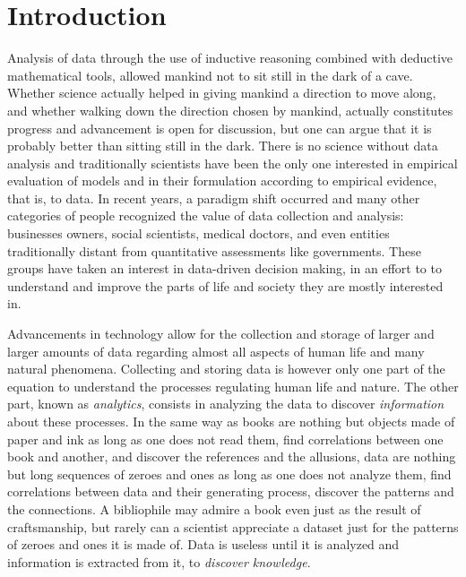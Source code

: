 \chapter{Introduction}\label{ch:intro}
Analysis of data through the use of inductive reasoning combined with
deductive mathematical tools, allowed mankind not to sit still in the dark of a
cave. Whether science actually helped in giving mankind a direction to move
along, and whether walking down the direction chosen by mankind, actually
constitutes progress and advancement is open for discussion, but one can argue
that it is probably better than sitting still in the dark. There is no science
without data analysis and traditionally scientists have been the only one
interested in empirical evaluation of models and in their formulation according
to empirical evidence, that is, to data. In recent years, a paradigm
shift occurred and many other categories of people recognized the value of data
collection and analysis: businesses owners, social scientists, medical doctors,
and even entities traditionally distant from quantitative assessments like
governments. These groups have taken an interest in data-driven decision making,
in an effort to to understand and improve the parts of life and society they are
mostly interested in.

Advancements in technology allow for the collection and storage of larger and
larger amounts of data regarding almost all aspects of human life and many
natural phenomena. Collecting and storing data is however only one part of the
equation to understand the processes regulating human life and nature. The
other part, known as \emph{analytics}, consists in analyzing the data to
discover \emph{information} about these processes. In the same way as books are
nothing but objects made of paper and ink as long as one does not read them,
find correlations between one book and another, and discover the references and
the allusions, data are nothing but long sequences of zeroes and ones as long as
one does not analyze them, find correlations between data and their generating
process, discover the patterns and the connections. A bibliophile may admire a
book even just as the result of craftsmanship, but rarely can a scientist
appreciate a dataset just for the patterns of zeroes and ones it is made of. Data
is useless until it is analyzed and information is extracted from it, to
\emph{discover knowledge}.

